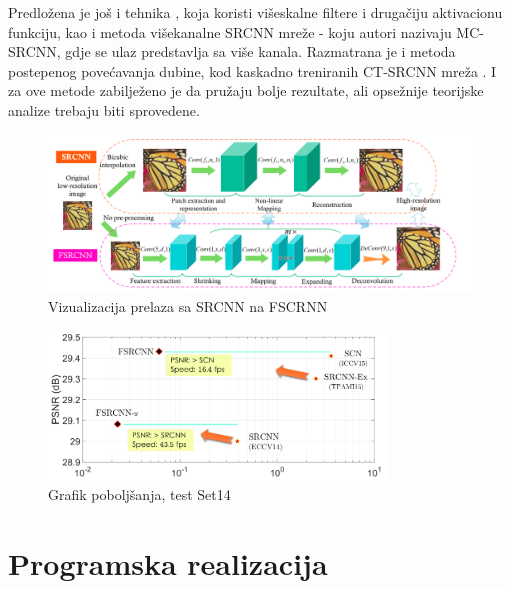 \documentclass[12pt]{report}
\numberwithin{equation}{section}
\begin{document}
 Predložena je još i tehnika \cite{improv2}, koja koristi višeskalne filtere i drugačiju aktivacionu funkciju, kao i metoda višekanalne SRCNN mreže \cite{improv3} - koju autori nazivaju MC-SRCNN, gdje se ulaz predstavlja sa više kanala. Razmatrana je i metoda postepenog povećavanja dubine, kod kaskadno treniranih CT-SRCNN mreža \cite{improv4}. I za ove metode zabilježeno je da pružaju bolje rezultate, ali opsežnije teorijske analize trebaju biti sprovedene.
 
 \begin{figure}[h]
\includegraphics[width=\textwidth]{SLIKE/better}
\centering
\caption{Vizualizacija prelaza sa SRCNN na FSCRNN}
\label{fig:improv_1}
\end{figure}

\begin{figure}[h]
\includegraphics[width=0.8\textwidth]{SLIKE/diagram}
\centering
\caption{Grafik poboljšanja, test Set14}
\label{fig:improv_2}
\end{figure} 
 
        
   

\chapter{Programska realizacija}\label{ch2}
 
 
\end{document}

